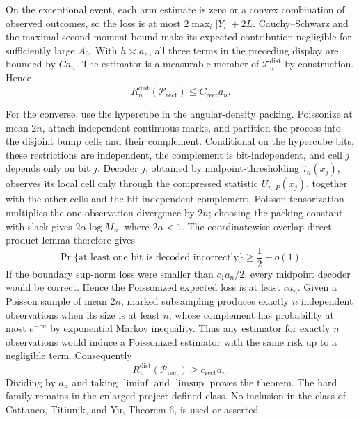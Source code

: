 On the exceptional event, each arm estimate is zero or a convex combination of observed outcomes, so the loss is at most \(2\max_i|Y_i|+2L\).  Cauchy--Schwarz and the maximal second-moment bound make its expected contribution negligible for sufficiently large \(A_0\).  With \(h\asymp a_n\), all three terms in the preceding display are bounded by \(Ca_n\).  The estimator is a measurable member of \(\mathcal T_n^{\mathrm{dist}}\) by construction.  Hence
\[
 R_n^{\mathrm{dist}}(\mathcal P_{\mathrm{rect}})\leq C_{\mathrm{rect}}a_n.
\]

For the converse, use the hypercube in the angular-density packing.  Poissonize at mean \(2n\), attach independent continuous marks, and partition the process into the disjoint bump cells and their complement.  Conditional on the hypercube bits, these restrictions are independent, the complement is bit-independent, and cell \(j\) depends only on bit \(j\).  Decoder \(j\), obtained by midpoint-thresholding \(\widehat\tau_n(x_j)\), observes its local cell only through the compressed statistic \(U_{n,P}(x_j)\), together with the other cells and the bit-independent complement.  Poisson tensorization multiplies the one-observation divergence by \(2n\); choosing the packing constant with slack gives \(2\alpha\log M_n\), where \(2\alpha<1\).  The coordinatewise-overlap direct-product lemma therefore gives
\[
 \Pr\{\text{at least one bit is decoded incorrectly}\}\geq\frac12-o(1).
\]
If the boundary sup-norm loss were smaller than \(c_1a_n/2\), every midpoint decoder would be correct.  Hence the Poissonized expected loss is at least \(ca_n\).  Given a Poisson sample of mean \(2n\), marked subsampling produces exactly \(n\) independent observations when its size is at least \(n\), whose complement has probability at most \(e^{-cn}\) by exponential Markov inequality.  Thus any estimator for exactly \(n\) observations would induce a Poissonized estimator with the same risk up to a negligible term.  Consequently
\[
 R_n^{\mathrm{dist}}(\mathcal P_{\mathrm{rect}})\geq c_{\mathrm{rect}}a_n.
\]
Dividing by \(a_n\) and taking \(\liminf\) and \(\limsup\) proves the theorem.  The hard family remains in the enlarged project-defined class.  No inclusion in the class of Cattaneo, Titiunik, and Yu, Theorem 6, is used or asserted.
